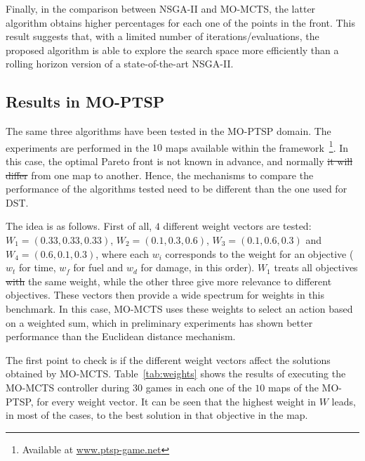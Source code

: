\documentclass[journal]{IEEEtran}
\providecommand{\DIFaddtex}[1]{{\protect\color{blue}\uwave{#1}}} %
\providecommand{\DIFdeltex}[1]{{\protect\color{red}\sout{#1}}}                      %
\providecommand{\DIFaddbegin}{} %
\providecommand{\DIFaddend}{} %
\providecommand{\DIFdelbegin}{} %
\providecommand{\DIFdelend}{} %
\providecommand{\DIFadd}[1]{\texorpdfstring{\DIFaddtex{#1}}{#1}} %
\providecommand{\DIFdel}[1]{\texorpdfstring{\DIFdeltex{#1}}{}} %
\begin{document}
Finally, in the comparison between NSGA-II and MO-MCTS, the latter algorithm obtains higher percentages for each one of the points in the front. This result suggests that, with a limited number of iterations/evaluations, the proposed algorithm is able to explore the search space more efficiently than a rolling horizon version of a state-of-the-art NSGA-II.


\subsection{Results in MO-PTSP} \label{ssec:resMOPTSP}

The same three algorithms have been tested in the MO-PTSP domain. The experiments are performed in the $10$ maps available within the framework~\footnote{Available at \url{www.ptsp-game.net}}. In this case, the optimal Pareto front is not known in advance, and normally \DIFdelbegin \DIFdel{it will differ }\DIFdelend \DIFaddbegin \DIFadd{differs }\DIFaddend from one map to another. Hence, the mechanisms to compare the performance of the algorithms tested need to be different than the one used for DST.

The idea is as follows. First of all, $4$ different weight vectors are tested: $W_1 = (0.33,0.33,0.33)$, $W_2 = (0.1,0.3,0.6)$, $W_3 = (0.1,0.6,0.3)$ and $W_4 = (0.6,0.1,0.3)$, where each $w_i$ corresponds to the weight for an objective ($w_t$ for time, $w_f$ for fuel and $w_d$ for damage, in this order). $W_1$ treats all objectives \DIFdelbegin \DIFdel{with }\DIFdelend \DIFaddbegin \DIFadd{as having }\DIFaddend the same weight, while the other three give more relevance to different objectives. These vectors then provide a wide spectrum for weights in this benchmark. In this case, MO-MCTS uses these weights to select an action based on a weighted sum, which in preliminary experiments has shown better performance than the Euclidean distance mechanism.

The first point to check is if the different weight vectors affect the solutions obtained by MO-MCTS. Table~\ref{tab:weights} shows the results of executing the MO-MCTS controller during $30$ games in each one of the $10$ maps of the MO-PTSP, for every weight vector. It can be seen that the highest weight in $W$ leads, in most of the cases, to the best solution in that objective in the map. 
\end{document}
